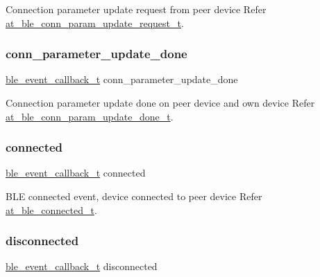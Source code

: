 Connection parameter update request from peer device Refer \mbox{\hyperlink{structat__ble__conn__param__update__request__t}{at\+\_\+ble\+\_\+conn\+\_\+param\+\_\+update\+\_\+request\+\_\+t}}. 

\mbox{\label{structble__gap__event__cb_a188c92b6f13d3c1043589b27e7be9c73}} 
\subsubsection{\texorpdfstring{conn\_parameter\_update\_done}{conn\_parameter\_update\_done}}
{\footnotesize\ttfamily \mbox{\hyperlink{ble__manager_8h_a04ce4bb8cb8282f2762e3924b1773cc9}{ble\+\_\+event\+\_\+callback\+\_\+t}} conn\+\_\+parameter\+\_\+update\+\_\+done}



Connection parameter update done on peer device and own device Refer \mbox{\hyperlink{structat__ble__conn__param__update__done__t}{at\+\_\+ble\+\_\+conn\+\_\+param\+\_\+update\+\_\+done\+\_\+t}}. 

\mbox{\label{structble__gap__event__cb_a3b38460284d2f0d8f1ae91fdd676c70e}} 
\subsubsection{\texorpdfstring{connected}{connected}}
{\footnotesize\ttfamily \mbox{\hyperlink{ble__manager_8h_a04ce4bb8cb8282f2762e3924b1773cc9}{ble\+\_\+event\+\_\+callback\+\_\+t}} connected}



B\+LE connected event, device connected to peer device Refer \mbox{\hyperlink{structat__ble__connected__t}{at\+\_\+ble\+\_\+connected\+\_\+t}}. 

\mbox{\label{structble__gap__event__cb_a62038f6df191ce8ba93813d8b1c304a9}} 
\subsubsection{\texorpdfstring{disconnected}{disconnected}}
{\footnotesize\ttfamily \mbox{\hyperlink{ble__manager_8h_a04ce4bb8cb8282f2762e3924b1773cc9}{ble\+\_\+event\+\_\+callback\+\_\+t}} disconnected}



